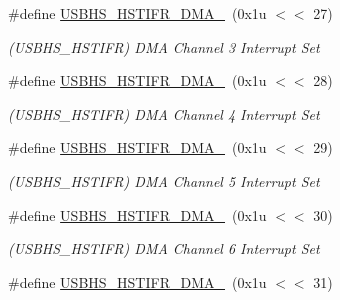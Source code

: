\begin{DoxyCompactItemize}
\mbox{\label{group__SAME70__USBHS_ga579f95492fa987c10290c53146a8b647}} 
\#define \mbox{\hyperlink{group__SAME70__USBHS_ga579f95492fa987c10290c53146a8b647}{U\+S\+B\+H\+S\+\_\+\+H\+S\+T\+I\+F\+R\+\_\+\+D\+M\+A\+\_}}~(0x1u $<$$<$ 27)
\begin{DoxyCompactList}\small\item\em (U\+S\+B\+H\+S\+\_\+\+H\+S\+T\+I\+FR) D\+MA Channel 3 Interrupt Set \end{DoxyCompactList}\item 
\mbox{\label{group__SAME70__USBHS_ga3668c66c2f3ddc898a55ad26cbaed287}} 
\#define \mbox{\hyperlink{group__SAME70__USBHS_ga3668c66c2f3ddc898a55ad26cbaed287}{U\+S\+B\+H\+S\+\_\+\+H\+S\+T\+I\+F\+R\+\_\+\+D\+M\+A\+\_}}~(0x1u $<$$<$ 28)
\begin{DoxyCompactList}\small\item\em (U\+S\+B\+H\+S\+\_\+\+H\+S\+T\+I\+FR) D\+MA Channel 4 Interrupt Set \end{DoxyCompactList}\item 
\mbox{\label{group__SAME70__USBHS_ga4a2554e3461869d5b36cb65dd4251719}} 
\#define \mbox{\hyperlink{group__SAME70__USBHS_ga4a2554e3461869d5b36cb65dd4251719}{U\+S\+B\+H\+S\+\_\+\+H\+S\+T\+I\+F\+R\+\_\+\+D\+M\+A\+\_}}~(0x1u $<$$<$ 29)
\begin{DoxyCompactList}\small\item\em (U\+S\+B\+H\+S\+\_\+\+H\+S\+T\+I\+FR) D\+MA Channel 5 Interrupt Set \end{DoxyCompactList}\item 
\mbox{\label{group__SAME70__USBHS_ga7e76b91c622cfc7c3a83a838ebd79dd4}} 
\#define \mbox{\hyperlink{group__SAME70__USBHS_ga7e76b91c622cfc7c3a83a838ebd79dd4}{U\+S\+B\+H\+S\+\_\+\+H\+S\+T\+I\+F\+R\+\_\+\+D\+M\+A\+\_}}~(0x1u $<$$<$ 30)
\begin{DoxyCompactList}\small\item\em (U\+S\+B\+H\+S\+\_\+\+H\+S\+T\+I\+FR) D\+MA Channel 6 Interrupt Set \end{DoxyCompactList}\item 
\mbox{\label{group__SAME70__USBHS_ga357833ba3c2fb4ededbecd8e876b1380}} 
\#define \mbox{\hyperlink{group__SAME70__USBHS_ga357833ba3c2fb4ededbecd8e876b1380}{U\+S\+B\+H\+S\+\_\+\+H\+S\+T\+I\+F\+R\+\_\+\+D\+M\+A\+\_}}~(0x1u $<$$<$ 31)
$$
\end{DoxyCompactItemize}
